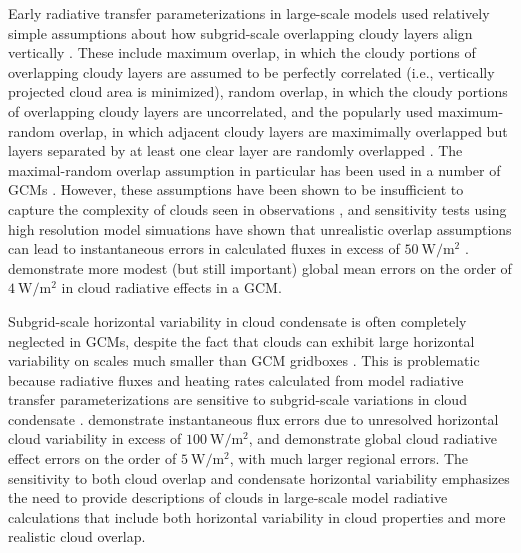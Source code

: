 Early radiative transfer parameterizations in large-scale models used relatively simple assumptions about how subgrid-scale overlapping cloudy layers align vertically \citep[e.g.,][]{collins_2001}. These include maximum overlap, in which the cloudy portions of overlapping cloudy layers are assumed to be perfectly correlated (i.e., vertically projected cloud area is minimized), random overlap, in which the cloudy portions of overlapping cloudy layers are uncorrelated, and the popularly used maximum-random overlap, in which adjacent cloudy layers are maximimally overlapped but layers separated by at least one clear layer are randomly overlapped \citep{geleyn_and_hollingsworth_1979}. The maximal-random overlap assumption in particular has been used in a number of GCMs \citep[e.g.,][]{collins_et_al_2004,neale_et_al_2010a,neale_et_al_2010b}. However, these assumptions have been shown to be insufficient to capture the complexity of clouds seen in observations \citep[e.g.,][]{hogan_and_illingworth_2000,mace_and_benson-troth_2002,barker_2008}, and sensitivity tests using high resolution model simuations have shown that unrealistic overlap assumptions can lead to instantaneous errors in calculated fluxes in excess of $50 ~\text{W}/\text{m}^2$ \citep{barker_et_al_1999,wu_and_liang_2005}. \cite{oreopoulos_et_al_2012} demonstrate more modest (but still important) global mean errors on the order of $4 ~\text{W}/\text{m}^2$ in cloud radiative effects in a GCM.

Subgrid-scale horizontal variability in cloud condensate is often completely neglected in GCMs, despite the fact that clouds can exhibit large horizontal variability on scales much smaller than GCM gridboxes \citep[e.g.,][]{stephens_and_platt_1987}. This is problematic because radiative fluxes and heating rates calculated from model radiative transfer parameterizations are sensitive to subgrid-scale variations in cloud condensate \citep[e.g.,][]{barker_et_al_1999,wu_and_liang_2005,oreopoulos_et_al_2012}. \cite{barker_et_al_1999} demonstrate instantaneous flux errors due to unresolved horizontal cloud variability in excess of $100 ~\text{W}/\text{m}^2$, and \cite{oreopoulos_et_al_2012} demonstrate global cloud radiative effect errors on the order of $5 ~\text{W}/\text{m}^2$, with much larger regional errors. The sensitivity to both cloud overlap and condensate horizontal variability emphasizes the need to provide descriptions of clouds in large-scale model radiative calculations that include both horizontal variability in cloud properties and more realistic cloud overlap.

